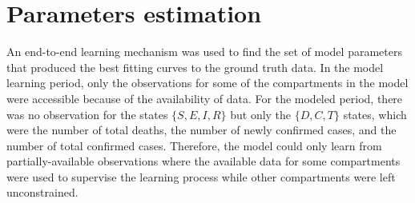 \section{Parameters estimation}
\label{sec:methodologies-parameters-estimation}

An end-to-end learning mechanism was used to find the set of model parameters that produced the best fitting curves to the ground truth data.
In the model learning period, only the observations for some of the compartments in the model were accessible because of the availability of data.
For the modeled period, there was no observation for the states $\{S, E, I, R\}$ but only the $\{D, C, T\}$ states, which were the number of total deaths, the number of newly confirmed cases, and the number of total confirmed cases.
Therefore, the model could only learn from partially-available observations where the available data for some compartments were used to supervise the learning process while other compartments were left unconstrained.

